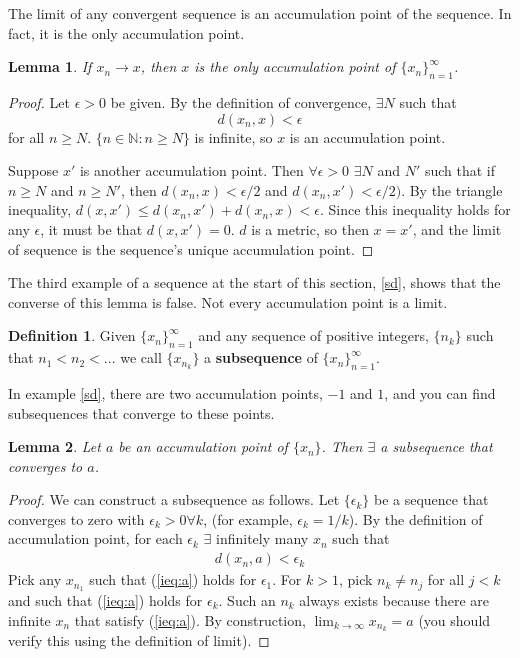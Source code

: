 \documentclass[12pt,reqno]{amsart}
\newtheorem{lemma}{Lemma}[section]
\theoremstyle{definition}
\newtheorem{definition}{Definition}[section]
\newcommand{\seq}[1]{\{{#1}_n \}_{n=1}^\infty }
\begin{document}
The limit of any convergent sequence is an accumulation point of the
sequence. In fact, it is the only accumulation point.
\begin{lemma}
  If $x_n \rightarrow x$, then $x$ is the only accumulation point of
  $\seq{x}$. 
\end{lemma}
\begin{proof}
  Let $\epsilon>0$ be given. By the definition of convergence,
  $\exists N$ such that 
  \[ d(x_n,x) < \epsilon \]
  for all $n \geq N$. $\{n\in \mathbb{N}: n\geq N\}$ is infinite, so
  $x$ is an accumulation point. 

  Suppose $x'$ is another accumulation point. Then $\forall
  \epsilon>0$ $\exists N$ and $N'$ such that if $n \geq N$ and $n \geq
  N'$, then $d(x_n, x) < \epsilon/2$ and $d(x_n,x') < \epsilon/2)$. By
  the triangle inequality, $d(x,x') \leq d(x_n,x') + d(x_n,x) <
  \epsilon$. Since this inequality holds for any $\epsilon$, it must
  be that $d(x,x') = 0$. $d$ is a metric, so then $x = x'$, and the
  limit of sequence is the sequence's unique accumulation point. 
\end{proof}
The third example of a sequence at the start of this section,
\ref{sd}, shows that the converse of this lemma is false. Not every
accumulation point is a limit. 
\begin{definition}
  Given $\seq{x}$ and any sequence of positive integers, $\{n_k\}$
  such that $n_1 < n_2 < ... $ we call $\{x_{n_k}\}$ a
  \textbf{subsequence} of $\seq{x}$. 
\end{definition}
In example \ref{sd}, there are two accumulation points, $-1$ and $1$,
and you can find subsequences that converge to these points. 
\begin{lemma}
  Let $a$ be an accumulation point of $\{x_n\}$. Then $\exists$
  a subsequence that converges to $a$. 
\end{lemma}
\begin{proof}
  We can construct a subsequence as follows. Let $\{\epsilon_k\}$ be a
  sequence that converges to zero with $\epsilon_k >0 \forall k$, (for
  example, $\epsilon_k = 1/k$). By the definition of accumulation
  point, for each $\epsilon_k$ $\exists$ infinitely many $x_n$ such
  that 
  \begin{align}
    d(x_n, a) < \epsilon_k \label{ieq:a}
  \end{align}
  Pick any $x_{n_1}$ such that (\ref{ieq:a}) holds for
  $\epsilon_1$. For $k>1$, pick $n_k \neq n_{j}$ for all $j<k$ and
  such that (\ref{ieq:a}) holds for $\epsilon_k$. Such an $n_k$ always
  exists because there are infinite $x_n$ that satisfy
  (\ref{ieq:a}). By construction, $\lim_{k\rightarrow \infty} x_{n_k}
  = a$ (you should verify this using the definition of limit).
\end{proof}
\end{document}
